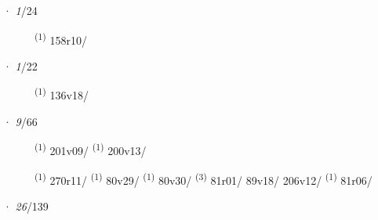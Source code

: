 \noindent{} · \textit{1}/24 \LEMMALINE
\begin{description}
    \item[]  \textsuperscript{(1)} \mbox{158r10/}
\end{description}
\ENTRYEND
\noindent{} · \textit{1}/22 \LEMMALINE
\begin{description}
    \item[]  \textsuperscript{(1)} \mbox{136v18/}
\end{description}
\ENTRYEND
\noindent{} · \textit{9}/66 \LEMMALINE
\begin{description}
    \item[]  \textsuperscript{(1)} \mbox{201v09/} \CASEBREAK {} \textsuperscript{(1)} \mbox{200v13/}
    \item[]  \textsuperscript{(1)} \mbox{270r11/} \CASEBREAK {} \textsuperscript{(1)} \mbox{80v29/} \CASEBREAK {} \textsuperscript{(1)} \mbox{80v30/} \CASEBREAK {} \textsuperscript{(3)} \mbox{81r01/} \mbox{89v18/} \mbox{206v12/} \CASEBREAK {} \textsuperscript{(1)} \mbox{81r06/}
\end{description}
\ENTRYEND
\noindent{} · \textit{26}/139 \LEMMALINE
